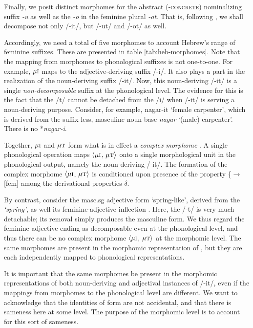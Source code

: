  Finally, we posit distinct morphomes for the abstract (-\textsc{concrete}) 
 nominalizing suffix \textit{-u}
 as well as the \textit{-o} in the feminine plural \textit{-ot}.
That is, following \cite{faust:2013}, we shall
decompose not only /-it/, but /-ut/ and /-ot/ as well. 

  Accordingly, we need a total of five morphomes
  to account Hebrew's range of feminine suffixes. These are presented in table \ref{tab:heb-morphomes}. 
  Note that the mapping from 
  morphomes to phonological suffixes is not one-to-one. For example, 
  $\mu{\textsc{i}}$ maps to the adjective-deriving suffix /-i/. It also 
  plays a part in the realization of the noun-deriving suffix /-it/. Now, 
  this noun-deriving /-it/ is a single \emph{non-decomposable} suffix at the phonological 
  level. The evidence for this is the fact that the /t/ cannot be detached 
  from the /i/ when /-it/ is serving a noun-deriving purpose. Consider, for 
  example, nagar-it `female carpenter', which is derived from the suffix-less, 
  masculine noun base \emph{nagar} `(male) carpenter'. 
There is no *\emph{nagar-i}.
  
Together, $\mu\textsc{i}$ and $\mu\textsc{t}$ form what is in effect  
a \emph{complex morphome} \citep{round:2015, round:md:2016}. A single 
phonological operation maps $\langle \mu\textsc{i}$, $\mu\textsc{t} \rangle$ 
onto a single morphological unit in the phonological output, namely the 
noun-deriving /-it/. The formation of the complex morphome $\langle \mu\textsc{i}$, 
$\mu\textsc{t} \rangle$ is conditioned upon presence of the 
property \{$\to$[fem] among the derivational properties $\delta$.

  By contrast, consider the masc.sg adjective form \emph{} 
  `spring-like', derived from the \emph{ `spring'}, 
  as well its feminine-adjective inflection  \emph{}. Here, the /-t/ 
  is very much detachable; its removal simply produces the masculine form. We
  thus regard the feminine adjective ending as decomposable even at the 
  phonological level, and thus there can be no complex morphome $\langle \mu\textsc{i}$, 
  $\mu\textsc{t} \rangle$ at the morphomic level. The same morphomes are present in the 
  morphomic representation of \emph{}, but they are each 
  independently mapped to phonological representations.
  
  It is important that the same morphomes be present in the morphomic 
  representations of both noun-deriving and adjectival instances of /-it/, 
  even if the mappings from morphomes to the phonological level are different. We 
  want to acknowledge that the identities of form are not accidental, 
  and that there is sameness here at some level. The purpose of the 
  morphomic level is to account for
  this sort of sameness.
  
